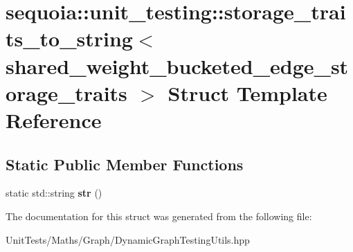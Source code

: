 \hypertarget{structsequoia_1_1unit__testing_1_1storage__traits__to__string_3_01shared__weight__bucketed__edge__storage__traits_01_4}{}\section{sequoia\+::unit\+\_\+testing\+::storage\+\_\+traits\+\_\+to\+\_\+string$<$ shared\+\_\+weight\+\_\+bucketed\+\_\+edge\+\_\+storage\+\_\+traits $>$ Struct Template Reference}
\label{structsequoia_1_1unit__testing_1_1storage__traits__to__string_3_01shared__weight__bucketed__edge__storage__traits_01_4}
\subsection*{Static Public Member Functions}
\begin{DoxyCompactItemize}
\item 
\mbox{\label{structsequoia_1_1unit__testing_1_1storage__traits__to__string_3_01shared__weight__bucketed__edge__storage__traits_01_4_a66d8255152b25bbeacd08b3a8d603ba7}} 
static std\+::string {\bfseries str} ()
\end{DoxyCompactItemize}


The documentation for this struct was generated from the following file\+:\begin{DoxyCompactItemize}
\item 
Unit\+Tests/\+Maths/\+Graph/Dynamic\+Graph\+Testing\+Utils.\+hpp\end{DoxyCompactItemize}
